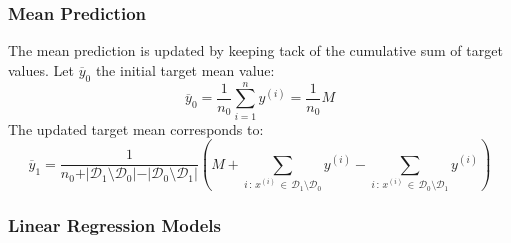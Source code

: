 \documentclass[a4paper, 11pt]{article}
\begin{document}
\subsubsection{Mean Prediction}

The mean prediction is updated by keeping tack of the cumulative sum of target values. Let $\overline{y}_0$ the initial target mean value:
$$
\overline{y}_0 = \frac{1}{n_0} \sum_{i = 1}^n y^{(i)} = \frac{1}{n_0} M
$$
The updated target mean corresponds to:
$$
\overline{y}_1 =  \frac{1}{n_0 + \vert \mathcal{D}_1 \setminus \mathcal{D}_0 \vert - \vert \mathcal{D}_0 \setminus \mathcal{D}_1 \vert}\left(M + \sum_{i \,:\, x^{(i)} \, \in \, \mathcal{D}_1 \setminus \mathcal{D}_0} y^{(i)} - \sum_{i \,:\, x^{(i)} \, \in \, \mathcal{D}_0 \setminus \mathcal{D}_1} y^{(i)} \right)
$$

\subsubsection{Linear Regression Models}
\end{document}
